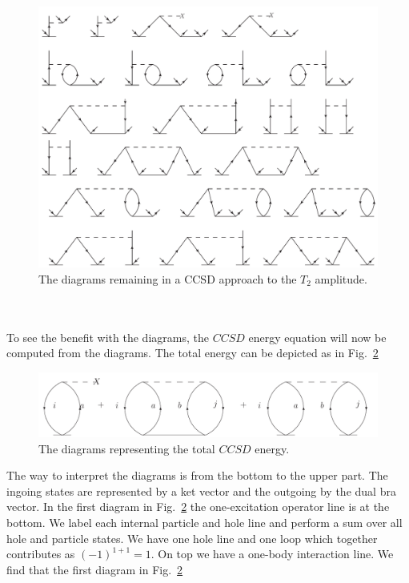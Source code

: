 \begin{figure}[htp]
\centering
\includegraphics[scale=0.5]{t2_eqn_diag2}%
\caption{The diagrams remaining in a CCSD approach to the
$T_2$ amplitude.}
\label{t2_eqn_diag_ccsd}
\end{figure}\\
\\
To see the benefit with the diagrams, the $CCSD$ energy 
equation will now be computed from the diagrams. The total 
energy can be depicted as in Fig.~\ref{totenergydi}\\
\begin{figure}[htp]
\centering
\includegraphics[width=1.0\textwidth]{energy}
\caption{The diagrams representing the total $CCSD$ 
energy.}
\label{totenergydi}
\end{figure}
The way to interpret the diagrams is from the bottom to the 
upper part. The ingoing states are 
represented by a ket vector and the outgoing by the dual bra 
vector. In the first diagram in Fig.~\ref{totenergydi} the one-excitation operator line is at the bottom. We
label each internal particle and hole line and perform a sum over all hole and particle states. We have one
hole line and one loop which together contributes as $(-1)^{1+1}=1$. On top we have a one-body
interaction line. We find that the first diagram in Fig.~\ref{totenergydi} 

